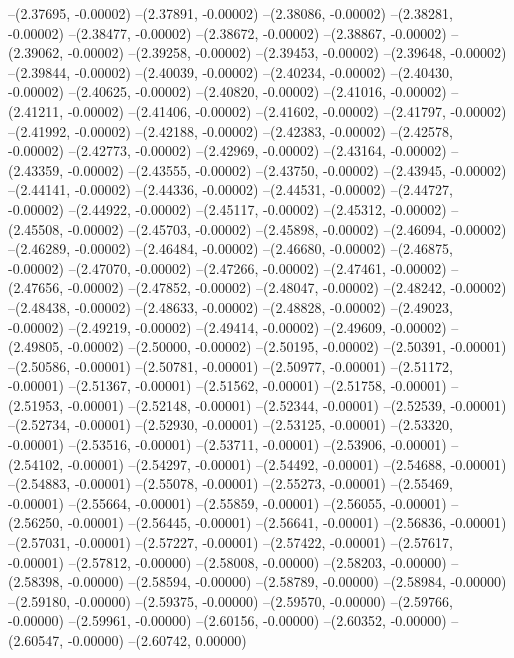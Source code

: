 --(2.37695, -0.00002)
--(2.37891, -0.00002)
--(2.38086, -0.00002)
--(2.38281, -0.00002)
--(2.38477, -0.00002)
--(2.38672, -0.00002)
--(2.38867, -0.00002)
--(2.39062, -0.00002)
--(2.39258, -0.00002)
--(2.39453, -0.00002)
--(2.39648, -0.00002)
--(2.39844, -0.00002)
--(2.40039, -0.00002)
--(2.40234, -0.00002)
--(2.40430, -0.00002)
--(2.40625, -0.00002)
--(2.40820, -0.00002)
--(2.41016, -0.00002)
--(2.41211, -0.00002)
--(2.41406, -0.00002)
--(2.41602, -0.00002)
--(2.41797, -0.00002)
--(2.41992, -0.00002)
--(2.42188, -0.00002)
--(2.42383, -0.00002)
--(2.42578, -0.00002)
--(2.42773, -0.00002)
--(2.42969, -0.00002)
--(2.43164, -0.00002)
--(2.43359, -0.00002)
--(2.43555, -0.00002)
--(2.43750, -0.00002)
--(2.43945, -0.00002)
--(2.44141, -0.00002)
--(2.44336, -0.00002)
--(2.44531, -0.00002)
--(2.44727, -0.00002)
--(2.44922, -0.00002)
--(2.45117, -0.00002)
--(2.45312, -0.00002)
--(2.45508, -0.00002)
--(2.45703, -0.00002)
--(2.45898, -0.00002)
--(2.46094, -0.00002)
--(2.46289, -0.00002)
--(2.46484, -0.00002)
--(2.46680, -0.00002)
--(2.46875, -0.00002)
--(2.47070, -0.00002)
--(2.47266, -0.00002)
--(2.47461, -0.00002)
--(2.47656, -0.00002)
--(2.47852, -0.00002)
--(2.48047, -0.00002)
--(2.48242, -0.00002)
--(2.48438, -0.00002)
--(2.48633, -0.00002)
--(2.48828, -0.00002)
--(2.49023, -0.00002)
--(2.49219, -0.00002)
--(2.49414, -0.00002)
--(2.49609, -0.00002)
--(2.49805, -0.00002)
--(2.50000, -0.00002)
--(2.50195, -0.00002)
--(2.50391, -0.00001)
--(2.50586, -0.00001)
--(2.50781, -0.00001)
--(2.50977, -0.00001)
--(2.51172, -0.00001)
--(2.51367, -0.00001)
--(2.51562, -0.00001)
--(2.51758, -0.00001)
--(2.51953, -0.00001)
--(2.52148, -0.00001)
--(2.52344, -0.00001)
--(2.52539, -0.00001)
--(2.52734, -0.00001)
--(2.52930, -0.00001)
--(2.53125, -0.00001)
--(2.53320, -0.00001)
--(2.53516, -0.00001)
--(2.53711, -0.00001)
--(2.53906, -0.00001)
--(2.54102, -0.00001)
--(2.54297, -0.00001)
--(2.54492, -0.00001)
--(2.54688, -0.00001)
--(2.54883, -0.00001)
--(2.55078, -0.00001)
--(2.55273, -0.00001)
--(2.55469, -0.00001)
--(2.55664, -0.00001)
--(2.55859, -0.00001)
--(2.56055, -0.00001)
--(2.56250, -0.00001)
--(2.56445, -0.00001)
--(2.56641, -0.00001)
--(2.56836, -0.00001)
--(2.57031, -0.00001)
--(2.57227, -0.00001)
--(2.57422, -0.00001)
--(2.57617, -0.00001)
--(2.57812, -0.00000)
--(2.58008, -0.00000)
--(2.58203, -0.00000)
--(2.58398, -0.00000)
--(2.58594, -0.00000)
--(2.58789, -0.00000)
--(2.58984, -0.00000)
--(2.59180, -0.00000)
--(2.59375, -0.00000)
--(2.59570, -0.00000)
--(2.59766, -0.00000)
--(2.59961, -0.00000)
--(2.60156, -0.00000)
--(2.60352, -0.00000)
--(2.60547, -0.00000)
--(2.60742, 0.00000)
